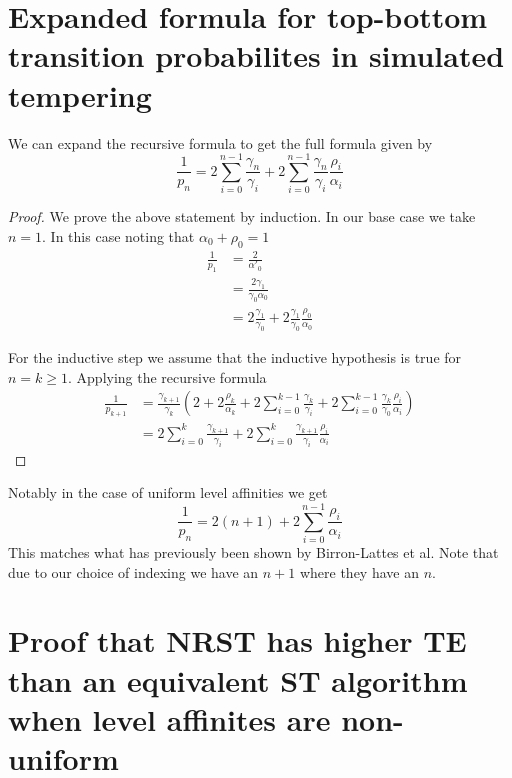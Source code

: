 \documentclass{article}
\begin{document}
\section{Expanded formula for top-bottom transition probabilites in simulated
tempering}
We can expand the recursive formula to get the full formula given by 
\[ \frac{1}{p_n} = 2\sum_{i=0}^{n-1}\frac{\gamma_n}{\gamma_i} +
2\sum_{i=0}^{n-1}\frac{\gamma_n}{\gamma_i}\frac{\rho_i}{\alpha_i}\]

\begin{proof}
    We prove the above statement by induction. In our base case we take
    $n=1$. In this case noting that $\alpha_0+\rho_0=1$
    \begin{align*}
        \frac{1}{p_1} &= \frac{2}{\alpha'_0} \\
        &= \frac{2\gamma_1}{\gamma_0\alpha_0} \\
        &= 2\frac{\gamma_1}{\gamma_0}+2\frac{\gamma_1}{\gamma_0}\frac{\rho_0}{\alpha_0}
    \end{align*}

    For the inductive step we assume that the inductive hypothesis is true
    for $n=k \geq 1$. Applying the recursive formula
    \begin{align*}
    \frac{1}{p_{k+1}} &= 
    \frac{\gamma_{k+1}}{\gamma_k}\left(2+
    2\frac{\rho_k}{\alpha_k}+
    2\sum_{i=0}^{k-1}\frac{\gamma_k}{\gamma_i} + 
    2\sum_{i=0}^{k-1}\frac{\gamma_k}{\gamma_0}\frac{\rho_i}{\alpha_i}\right) \\
    &= 2\sum_{i=0}^{k} \frac{\gamma_{k+1}}{\gamma_i} +
    2\sum_{i=0}^{k}\frac{\gamma_{k+1}}{\gamma_i}\frac{\rho_i}{\alpha_i}
    \end{align*}
\end{proof}
Notably in the case of uniform level affinities we get
\[ \frac{1}{p_n} = 2(n+1) + 2\sum_{i=0}^{n-1} \frac{\rho_i}{\alpha_i} \]
This matches what has previously been shown by Birron-Lattes et al. Note that
due to our choice of indexing we have an $n+1$ where they have an $n$.

\section{Proof that NRST has higher TE than an equivalent ST algorithm
when level affinites are non-uniform}
\end{document}
